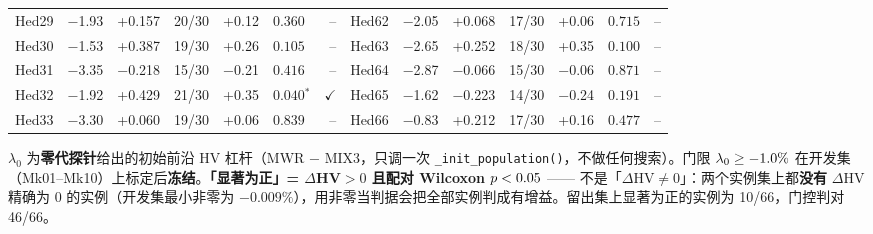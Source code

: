 \begin{table}[htbp]
{\begin{tabular}{rrrrrlr@{\hspace{6pt}}rrrrrlr}
    Hed29 & −1.93 & +0.157 & 20/30 & +0.12 & $0.360$ & -- & Hed62 & −2.05 & +0.068 & 17/30 & +0.06 & $0.715$ & -- \\
    Hed30 & −1.53 & +0.387 & 19/30 & +0.26 & $0.105$ & -- & Hed63 & −2.65 & +0.252 & 18/30 & +0.35 & $0.100$ & -- \\
    Hed31 & −3.35 & −0.218 & 15/30 & −0.21 & $0.416$ & -- & Hed64 & −2.87 & −0.066 & 15/30 & −0.06 & $0.871$ & -- \\
    Hed32 & −1.92 & +0.429 & 21/30 & +0.35 & $0.040{}^{*}$ & $\checkmark$ & Hed65 & −1.62 & −0.223 & 14/30 & −0.24 & $0.191$ & -- \\
    Hed33 & −3.30 & +0.060 & 19/30 & +0.06 & $0.839$ & -- & Hed66 & −0.83 & +0.212 & 17/30 & +0.16 & $0.477$ & -- \\
    \bottomrule
  \end{tabular}
  }
  \par\vspace{3pt}\footnotesize\begin{minipage}{\linewidth}$\lambda_0$ 为\textbf{零代探针}给出的初始前沿 HV 杠杆（MWR $-$ MIX3，只调一次 \texttt{\_init\_population()}，不做任何搜索）。门限 $\lambda_0\ge-1.0\%$ 在开发集（Mk01--Mk10）上标定后\textbf{冻结}。\textbf{「显著为正」= $\Delta$HV$>0$ 且配对 Wilcoxon $p<0.05$} —— 不是「$\Delta$HV$\neq 0$」：两个实例集上都\textbf{没有} $\Delta$HV 精确为 0 的实例（开发集最小非零为 $−0.009\%$），用非零当判据会把全部实例判成有增益。留出集上显著为正的实例为 10/66，门控判对 46/66。\end{minipage}
\end{table}

